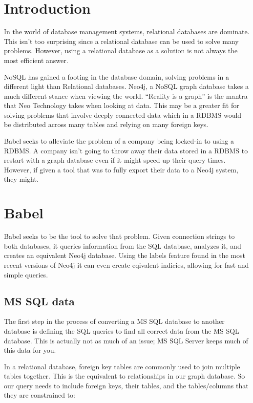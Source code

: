 \documentclass{acm_proc_article-sp}
\begin{document}
\section{Introduction}

In the world of database management systems, relational databases are dominate. This isn't too surprising since a relational database can be used to solve many problems. However, using a relational database as a solution is not always the most efficient answer.

NoSQL has gained a footing in the database domain, solving problems in a different light than Relational databases. Neo4j, a NoSQL graph database takes a much different stance when viewing the world. ``Reality is a graph''\cite{neo4j:neo4j} is the mantra that Neo Technology takes when looking at data. This may be a greater fit for solving problems that involve deeply connected data which in a RDBMS would be distributed across many tables and relying on many foreign keys. \cite{webber:graph}

Babel seeks to alleviate the problem of a company being locked-in to using a RDBMS. A company isn't going to throw away their data stored in a RDBMS to restart with a graph database even if it might speed up their query times. However, if given a tool that was to fully export their data to a Neo4j system, they might.

\section{Babel}

Babel seeks to be the tool to solve that problem. Given connection strings to both databases, it queries information from the SQL database, analyzes it, and creates an equivalent Neo4j database. Using the labels feature found in the most recent versions of Neo4j it can even create eqivalent indicies, allowing for fast and simple queries.

\subsection{MS SQL data}

The first step in the process of converting a MS SQL database to another database is defining the SQL queries to find all correct data from the MS SQL database. This is actually not as much of an issue; MS SQL Server keeps much of this data for you.

In a relational database, foreign key tables are commonly used to join
multiple tables together. This is the equivalent to relationships in
our graph database. So our query needs to include foreign keys, their tables, and the tables/columns that they are constrained to:
\end{document}
